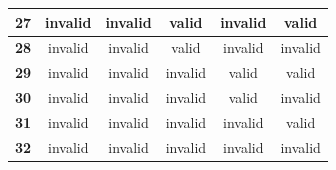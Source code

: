 \begin{table}[H]
\begin{tabular}{cccccc}
        \textbf{27} & invalid       & invalid       & valid                      & invalid                & valid              \\
        \hline
        \textbf{28} & invalid       & invalid       & valid                      & invalid                & invalid            \\
        \hline
        \textbf{29} & invalid       & invalid       & invalid                    & valid                  & valid              \\
        \hline
        \textbf{30} & invalid       & invalid       & invalid                    & valid                  & invalid            \\
        \hline
        \textbf{31} & invalid       & invalid       & invalid                    & invalid                & valid              \\
        \hline
        \textbf{32} & invalid       & invalid       & invalid                    & invalid                & invalid            \\
        \hline
    \end{tabular}
\end{table}

